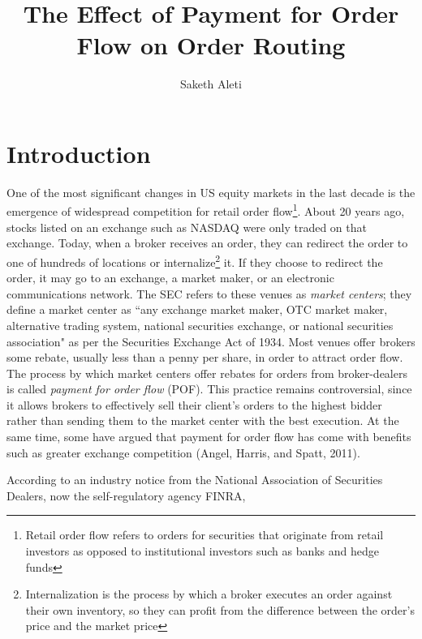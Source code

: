 \documentclass[12pt,a4paper]{article}
\begin{document}
	
\title{The Effect of Payment for Order Flow on Order Routing}

\author[]{Saketh Aleti}


\maketitle


\section{Introduction}	

One of the most significant changes in US equity markets in the last decade is the emergence of widespread competition for retail order flow\footnote{ Retail order flow refers to orders for securities that originate from retail investors as opposed to institutional investors such as banks and hedge funds}. About 20 years ago, stocks listed on an exchange such as NASDAQ were only traded on that exchange. Today, when a broker receives an order, they can redirect the order to one of hundreds of locations or internalize\footnote{ Internalization is the process by which a broker executes an order against their own inventory, so they can profit from the difference between the order's price and the market price} it. If they choose to redirect the order, it may go to an exchange, a market maker, or an electronic communications network. 
The SEC refers to these venues as \textit{market centers}; they define a market center as ``any exchange market maker, OTC market maker, alternative trading system, national securities exchange, or national securities association" as per the Securities Exchange Act of 1934.
Most venues offer brokers some rebate, usually less than a penny per share, in order to attract order flow.  The process by which market centers offer rebates for orders from broker-dealers is called \textit{payment for order flow} (POF). This practice remains controversial, since it allows brokers to effectively sell their client's orders to the highest bidder rather than sending them to the market center with the best execution. At the same time, some have argued that payment for order flow has come with benefits such as greater exchange competition (Angel, Harris, and Spatt, 2011). 


According to an industry notice from the National Association of Securities Dealers, now the self-regulatory agency FINRA,
\end{document}
